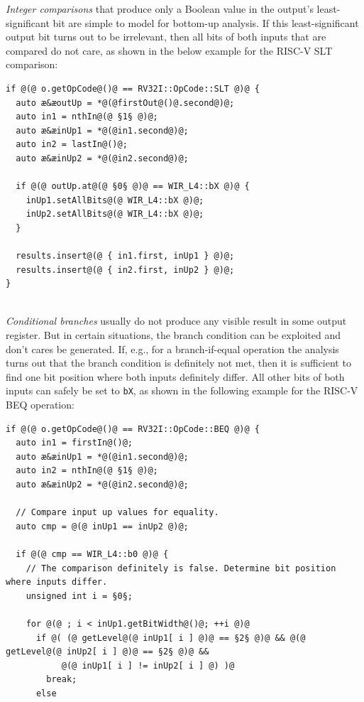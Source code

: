 \begin{enumerate}[resume]
  \emph{Integer comparisons} that produce only a Boolean value in the output's least-significant bit are simple to model for bottom-up analysis.
  If this least-significant output bit turns out to be irrelevant, then all bits of both inputs that are compared do not care, as shown in the below example for the RISC-V SLT comparison: \\
\begin{lstlisting}[style=code,float=!h,xleftmargin=10mm,aboveskip=-0.8 \baselineskip,belowskip=-0.8 \baselineskip]
if @(@ o.getOpCode@()@ == RV32I::OpCode::SLT @)@ {
  auto æ&æoutUp = *@(@firstOut@()@.second@)@;
  auto in1 = nthIn@(@ §1§ @)@;
  auto æ&æinUp1 = *@(@in1.second@)@;
  auto in2 = lastIn@()@;
  auto æ&æinUp2 = *@(@in2.second@)@;

  if @(@ outUp.at@(@ §0§ @)@ == WIR_L4::bX @)@ {
    inUp1.setAllBits@(@ WIR_L4::bX @)@;
    inUp2.setAllBits@(@ WIR_L4::bX @)@;
  }

  results.insert@(@ { in1.first, inUp1 } @)@;
  results.insert@(@ { in2.first, inUp2 } @)@;
}
\end{lstlisting}
  \\
  \emph{Conditional branches} usually do not produce any visible result in some output register.
  But in certain situations, the branch condition can be exploited and don't cares be generated.
  If, e.g., for a branch-if-equal operation the analysis turns out that the branch condition is definitely not met, then it is sufficient to find one bit position where both inputs definitely differ.
  All other bits of both inputs can safely be set to \texttt{bX}, as shown in the following example for the RISC-V BEQ operation: \\
\begin{lstlisting}[style=code,float=!ht,xleftmargin=10mm,belowskip=-0.8 \baselineskip]
if @(@ o.getOpCode@()@ == RV32I::OpCode::BEQ @)@ {
  auto in1 = firstIn@()@;
  auto æ&æinUp1 = *@(@in1.second@)@;
  auto in2 = nthIn@(@ §1§ @)@;
  auto æ&æinUp2 = *@(@in2.second@)@;

  // Compare input up values for equality.
  auto cmp = @(@ inUp1 == inUp2 @)@;

  if @(@ cmp == WIR_L4::b0 @)@ {
    // The comparison definitely is false. Determine bit position where inputs differ.
    unsigned int i = §0§;

    for @(@ ; i < inUp1.getBitWidth@()@; ++i @)@
      if @( (@ getLevel@(@ inUp1[ i ] @)@ == §2§ @)@ && @(@ getLevel@(@ inUp2[ i ] @)@ == §2§ @)@ &&
           @(@ inUp1[ i ] != inUp2[ i ] @) )@
        break;
      else


\end{lstlisting}
\end{enumerate}
